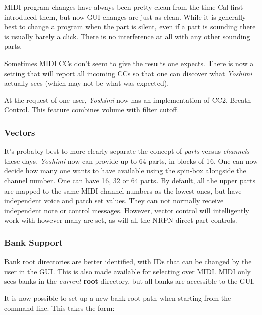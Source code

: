 \documentclass[
 11pt,
 twoside,
 a4paper,
 final                                 %
]{article}
\begin{document}
   MIDI program changes have always been pretty clean from the time Cal first
   introduced them, but now GUI changes are just as clean. While it is
   generally best to change a program when the part is silent, even if a part
   is sounding there is usually barely a click. There is no interference at all
   with any other sounding parts.

   Sometimes MIDI CCs don't seem to give the results one expects. There is
   now a setting that will report all incoming CCs so that one can discover
   what \textsl{Yoshimi} actually sees (which may not be what was expected).

   At the request of one user, \textsl{Yoshimi} now has an
   implementation of CC2, Breath Control.
   This feature combines volume with
   filter cutoff.

\subsubsection{Vectors}
\label{subsubsec:new_features_vectors}

   It's probably best to more clearly separate the concept of
   \textsl{parts} versus \textsl{channels} these days. 
   \textsl{Yoshimi} now can provide up to 64 parts, in blocks of 16. One can
   now decide how many one wants to have available using the spin-box alongside
   the channel number.  One can have 16, 32 or 64 parts.  By default, all the
   upper parts are mapped to the same MIDI channel numbers as the lowest ones,
   but have independent voice and patch set values. They can not normally
   receive independent note or control messages. However, vector control will
   intelligently work with however many are set, as will all the NRPN direct
   part controls.

\subsubsection{Bank Support}
\label{subsubsec:new_features_bank_support}

   Bank root directories are better identified, with IDs that can be changed by
   the user in the GUI. This is also made available for selecting over MIDI.
   MIDI only sees banks in the \textsl{current}
   \textbf{root} directory, but all banks are accessible to the GUI.

   It is now possible to set up a new bank root path when starting from the
   command line. This takes the form:
\end{document}
